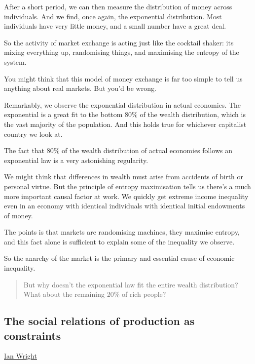\documentclass[
]{book}
\begin{document}
After a short period, we can then measure the distribution of money across individuals. And we find, once again, the exponential distribution. Most individuals have very little money, and a small number have a great deal.

So the activity of market exchange is acting just like the cocktail shaker: its mixing everything up, randomising things, and maximising the entropy of the system.

You might think that this model of money exchange is far too simple to tell us anything about real markets. But you'd be wrong.

Remarkably, we observe the exponential distribution in actual economies. The exponential is a great fit to the bottom 80\% of the wealth distribution, which is the vast majority of the population. And this holds true for whichever capitalist country we look at.

The fact that 80\% of the wealth distribution of actual economies follows an exponential law is a very astonishing regularity.

We might think that differences in wealth must arise from accidents of birth or personal virtue. But the principle of entropy maximisation tells us there's a much more important causal factor at work. We quickly get extreme income inequality even in an economy with identical individuals with identical initial endowments of money.

The points is that markets are randomising machines, they maximise entropy, and this fact alone is sufficient to explain some of the inequality we observe.

So the anarchy of the market is the primary and essential cause of economic inequality.

\begin{quote}
But why doesn't the exponential law fit the entire wealth distribution?
What about the remaining 20\% of rich people?
\end{quote}

\hypertarget{the-social-relations-of-production-as-constraints}{%
\subsection{The social relations of production as constraints}\label{the-social-relations-of-production-as-constraints}}

\href{https://ianwrightsite.wordpress.com/2017/11/16/the-social-architecture-of-capitalism/}{Ian Wright}
\end{document}
